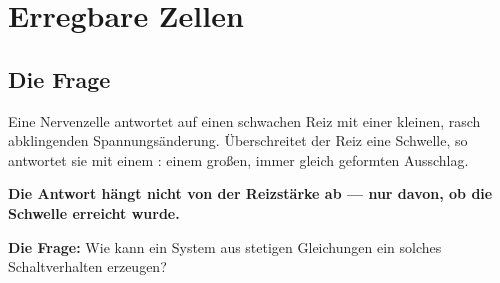 \chapter{Erregbare Zellen}

\section{Die Frage}

\begin{merksatz}
Eine Nervenzelle antwortet auf einen schwachen Reiz mit einer kleinen, rasch abklingenden Spannungsänderung. Überschreitet der Reiz eine Schwelle, so antwortet sie mit einem : einem großen, immer gleich geformten Ausschlag.

\begin{center}
\begin{minipage}{0.9\textwidth}
\textbf{Die Antwort hängt nicht von der Reizstärke ab --- nur davon, ob die Schwelle erreicht wurde.}
\end{minipage}
\end{center}

\textbf{Die Frage:} Wie kann ein System aus stetigen Gleichungen ein solches Schaltverhalten erzeugen?
\end{merksatz}

